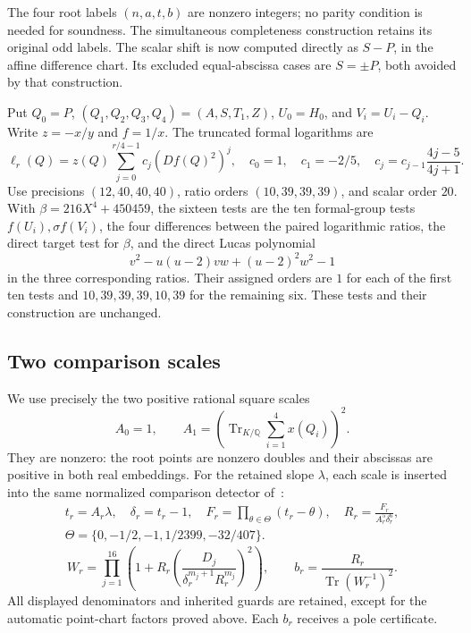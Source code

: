 \documentclass[11pt,a4paper]{article}
\newcommand{\Q}{\mathbb Q}\newcommand{\Z}{\mathbb Z}
\DeclareMathOperator{\Tr}{Tr}
\begin{document}
The four root labels $(n,a,t,b)$ are nonzero integers; no parity
condition is needed for soundness. The simultaneous completeness
construction retains its original odd labels. The scalar shift
is now computed directly as $S-P$, in the affine difference
chart. Its excluded equal-abscissa cases are $S=\pm P$, both
avoided by that construction.

Put $Q_0=P$, $(Q_1,Q_2,Q_3,Q_4)=(A,S,T_1,Z)$,
$U_0=H_0$, and $V_i=U_i-Q_i$. Write $z=-x/y$ and $f=1/x$.
The truncated formal logarithms are
\[
 \ell_r(Q)=z(Q)\sum_{j=0}^{r/4-1}c_j(Df(Q)^2)^j,
 \quad c_0=1,\quad c_1=-2/5,\quad
 c_j=c_{j-1}\frac{4j-5}{4j+1}.
\]
Use precisions $(12,40,40,40)$, ratio orders $(10,39,39,39)$,
and scalar order $20$. With
$\beta=216X^4+450459$, the sixteen tests are the ten
formal-group tests $f(U_i),\sigma f(V_i)$, the four differences
between the paired logarithmic ratios, the direct target test
for $\beta$, and the direct Lucas polynomial
\[
 v^2-u(u-2)vw+(u-2)^2w^2-1
\]
in the three corresponding ratios. Their assigned orders are
$1$ for each of the first ten tests and
$10,39,39,39,10,39$ for the remaining six. These tests and
their construction are unchanged.

\subsection{Two comparison scales}

We use precisely the two positive rational
square scales
\begin{equation}\label{eq:scales}
 A_0=1,\qquad
 A_1=\left(\Tr_{K/\Q}\sum_{i=1}^4x(Q_i)\right)^2.
\end{equation}
They are nonzero: the root points are nonzero doubles and
their abscissas are positive in both real embeddings.
For the retained slope $\lambda$, each scale is inserted into
the same normalized comparison detector of~\cite{Baseline}:
\[
 \begin{gathered}
 t_r=A_r\lambda,\quad \delta_r=t_r-1,\quad
 F_r=\prod_{\theta\in\Theta}(t_r-\theta),\quad
 R_r=\frac{F_r}{A_r^5\delta_r^6},\\
 \Theta=\{0,-1/2,-1,1/2399,-32/407\}.
 \end{gathered}
\]
\[
 W_r=\prod_{j=1}^{16}\left(
 1+R_r\left(\frac{D_j}{\delta_r^{m_j+1}R_r^{m_j}}\right)^2\right),
 \qquad b_r=\frac{R_r}{\Tr(W_r^{-1})^2}.
\]
All displayed denominators and inherited guards are retained,
except for the automatic point-chart factors proved above.
Each $b_r$ receives a pole certificate.
\end{document}
